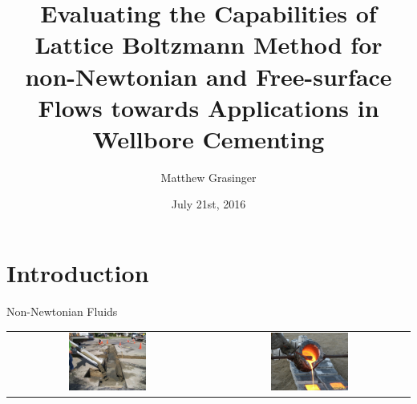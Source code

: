 \documentclass[pdf]{beamer}
\title{Evaluating the Capabilities of Lattice Boltzmann Method for non-Newtonian and Free-surface Flows towards Applications in Wellbore Cementing}
\author{Matthew Grasinger}
\date{July 21st, 2016}
\institute{University of Pittsburgh}
\begin{document}
\begin{frame}
\titlepage
\end{frame}

\newcommand{\pw}{0.4\textwidth}
\newcommand{\ph}{0.4\textheight}

\section{Introduction}

\begin{frame}{Non-Newtonian Fluids}
  \begin{table}
    \centering
  \begin{tabular}{cc}
    \includegraphics[width=\pw, height=\ph, keepaspectratio]{figs/slurry-backfill} & \includegraphics[width=\pw, height=\ph, keepaspectratio]{figs/molten-metal} \\

\end{tabular}
\end{table}
\end{frame}
\end{document}
